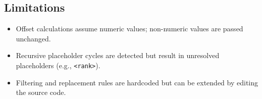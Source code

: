 \subsection{Limitations}
\begin{itemize}
    \item Offset calculations assume numeric values; non-numeric values are passed unchanged.
    \item Recursive placeholder cycles are detected but result in unresolved placeholders (e.g., \texttt{<rank>}).
    \item Filtering and replacement rules are hardcoded but can be extended by editing the source code.
\end{itemize}

